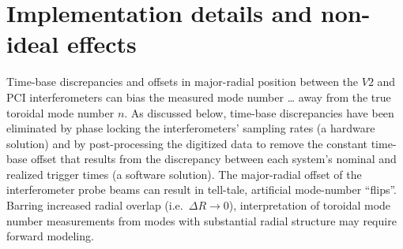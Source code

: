 

\section{Implementation details and non-ideal effects}
\label{sec:ToroidalCorrelation:implementation_details_and_nonideal_effects}
Time-base discrepancies and offsets in major-radial position
between the $V2$ and PCI interferometers
can bias the measured mode number \ldots
away from the true toroidal mode number $n$.
As discussed below, time-base discrepancies have been eliminated
by phase locking the interferometers' sampling rates
(a hardware solution) and
by post-processing the digitized data
to remove the constant time-base offset
that results from the discrepancy
between each system's nominal and realized trigger times
(a software solution).
The major-radial offset of the interferometer probe beams
can result in tell-tale, artificial mode-number ``flips''.
Barring increased radial overlap (i.e.\ $\Delta R \rightarrow 0$),
interpretation of toroidal mode number measurements
from modes with substantial radial structure
\graffito{\textcolor{red}{forward-modeling ref}}
may require forward modeling.


